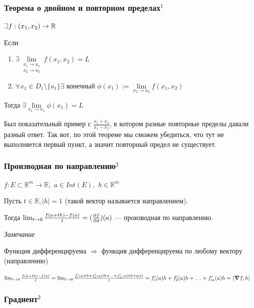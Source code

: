 \documentclass{article}
\def\letus{%
\mathord{\setbox0=\hbox{$\exists$}%
         \hbox{\kern 0.125\wd0%
               \vbox to \ht0{%
                  \hrule width 0.75\wd0%
                  \vfill%
                  \hrule width 0.75\wd0}%
               \vrule height \ht0%
               \kern 0.125\wd0}%
       }%
        }
\def\dbl{\,\,}
\begin{document}
\subsubsection{Теорема о двойном и повторном пределах\texorpdfstring{$^1$}{}}
$\letus f: (x_1, x_2) \rightarrow \mathbb{R}$

Если
\begin{enumerate}
    \item $\exists \lim\limits_{\begin{array}{c} x_1\rightarrow a_1 \\ x_2 \rightarrow a_2 \end{array}} f(x_1, x_2) = L$
    \item $\forall x_1 \in D_1 \setminus \{a_1\} \exists$ конечный $\phi(x_1) := \lim\limits_{x_2\rightarrow a_2} f(x_1, x_2)$
\end{enumerate}
Тогда $\exists \lim\limits_{x_1\rightarrow a_1} \phi(x_1) = L$

Был показательный пример с $\frac{x_1+x_2}{x_1-x_2}$, в котором разные повторные пределы давали разный ответ. Так вот, по этой теореме мы сможем убедиться, что тут не выполняется первый пункт, а значит повторный предел не существует.

\subsubsection{Производная по направлению\texorpdfstring{$^2$}{}}

$f: E \subset \mathbb{R}^m \rightarrow \mathbb{R}, \dbl a \in Int(E), \dbl h \in \mathbb{R}^m$

Пусть $t \in \mathbb{R}, |h| = 1$ (такой вектор  называется направлением).

Тогда $\lim_{t \rightarrow 0}{\frac{f(a + th) - f(a)}{t}} = (\pdv{f}{d})(a)$ --- производная по направлению. 

\textit{Замечание}

Функция дифференцируема $\Rightarrow$ функция дифференцируема по любому вектору (направлению)

$\lim_{t \rightarrow 0}{\frac{f(a + th) - f(a)}{t}} = \lim_{t \rightarrow 0}{\frac{f^\prime_1(a)th + f^\prime_2(a)th + \ldots + f^\prime_m(a)th + o(t)}{t}} = f^\prime_1(a)h + f^\prime_2(a)h + \ldots + f^\prime_m(a)h = \langle \grad f, h \rangle$

\subsubsection{Градиент\texorpdfstring{$^2$}{}}
\end{document}
